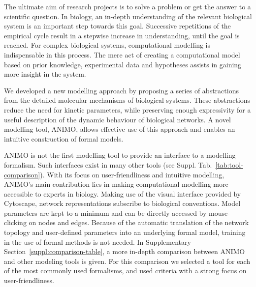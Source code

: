 The ultimate aim of research projects is to solve a problem or get
the answer to a scientific question. In biology, an in-depth understanding of
the relevant biological system is an important step towards this goal. Successive 
repetitions of the empirical cycle result in a stepwise increase in understanding,
until the goal is reached. For complex biological systems, computational modelling is 
indispensable in this process. The mere act of creating 
a computational model based on prior knowledge, experimental data and hypotheses 
assists in gaining more insight in the system. 


We developed a new modelling approach by proposing a series of abstractions from the detailed 
molecular mechanisms of biological systems. These abstractions reduce the need for kinetic 
parameters, while preserving enough expressivity for a useful description of the dynamic 
behaviour of biological networks. A novel modelling tool, ANIMO, allows 
effective use of this approach and enables an intuitive construction of formal models.

ANIMO is not the first modelling tool to provide an interface to a
modelling formalism. Such interfaces exist in many other tools (see Suppl. Tab.~\ref{tab:tool-comparison}). With its
focus on user-friendliness and intuitive modelling, ANIMO's main contribution lies 
in making computational modelling more accessible to experts in biology.
Making use of the visual
interface provided by Cytoscape, network representations subscribe to biological conventions. 
Model parameters are kept to a minimum and can be directly accessed by mouse-clicking on 
nodes and edges. Because of the automatic translation of the network topology and 
user-defined parameters into an underlying formal model, training in the use of formal methods 
is not needed. In Supplementary Section~\ref{suppl:comparison-table}, a more in-depth
comparison between ANIMO and other modeling tools is given. For this comparison we selected a tool
for each of the most commonly used formalisms, and used criteria with a strong focus on 
user-friendliness.

